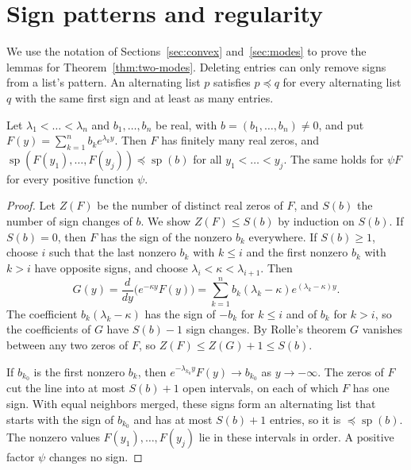 \section{Sign patterns and regularity}\label{app:modes}

We use the notation of Sections~\ref{sec:convex} and~\ref{sec:modes}
to prove the lemmas for Theorem~\ref{thm:two-modes}.
Deleting entries can only remove signs from a list's pattern. An alternating list $p$ satisfies
$p\preceq q$ for every alternating list $q$ with the same first sign and at
least as many entries.

\begin{lemma}\label{lem:descartes}
Let $\lambda_1<\dots<\lambda_n$ and $b_1,\dots,b_n$ be real, with
$b=(b_1,\dots,b_n)\ne0$, and put $F(y)=\sum_{k=1}^nb_ke^{\lambda_ky}$. Then
$F$ has finitely many real zeros, and
$\operatorname{sp}(F(y_1),\dots,F(y_j))\preceq\operatorname{sp}(b)$ for all
$y_1<\dots<y_j$. The same holds for $\psi F$ for every positive function
$\psi$.
\end{lemma}

\begin{proof}
Let $Z(F)$ be the number of distinct real zeros of $F$, and $S(b)$ the number
of sign changes of $b$. We show $Z(F)\le S(b)$ by induction on $S(b)$. If
$S(b)=0$, then $F$ has the sign of the nonzero $b_k$ everywhere. If $S(b)\ge1$,
choose $i$ such that the last nonzero $b_k$ with $k\le i$ and the first
nonzero $b_k$ with $k>i$ have opposite signs, and choose
$\lambda_i<\kappa<\lambda_{i+1}$. Then
\[
 G(y)=\frac{d}{dy}\bigl(e^{-\kappa y}F(y)\bigr)
 =\sum_{k=1}^nb_k(\lambda_k-\kappa)e^{(\lambda_k-\kappa)y}.
\]
The coefficient $b_k(\lambda_k-\kappa)$ has the sign of $-b_k$ for $k\le i$
and of $b_k$ for $k>i$, so the coefficients of $G$ have $S(b)-1$ sign changes.
By Rolle's theorem $G$ vanishes between any two zeros of $F$, so
$Z(F)\le Z(G)+1\le S(b)$.

If $b_{k_0}$ is the first nonzero $b_k$, then
$e^{-\lambda_{k_0}y}F(y)\to b_{k_0}$ as $y\to-\infty$. The zeros of $F$ cut the
line into at most $S(b)+1$ open intervals, on each of which $F$ has one sign.
With equal neighbors merged, these signs form an alternating list that starts
with the sign of $b_{k_0}$ and has at most $S(b)+1$ entries, so it is
$\preceq\operatorname{sp}(b)$. The nonzero values $F(y_1),\dots,F(y_j)$ lie in
these intervals in order. A positive factor $\psi$ changes no sign.
\end{proof}

